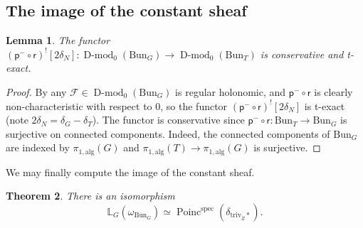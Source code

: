 \documentclass[11pt]{amsart}
\newcommand{\cF}{\mathcal{F}}
\newcommand{\triv}{\mathrm{triv}}
\newcommand{\spec}{\mathrm{spec}}
\newcommand{\Bun}{{\mathrm{Bun}}}
\newcommand{\Poinc}{\operatorname{Poinc}}
\newcommand{\pp}{{\mathsf{p}}}
\newcommand{\rr}{{\mathsf{r}}}
\DeclareMathOperator{\Dmod}{D-mod}
\newtheorem{thm}{Theorem}[section]
\newtheorem{lemma}[thm]{Lemma}
\theoremstyle{remark}
\theoremstyle{definition}
\begin{document}
\subsection{The image of the constant sheaf}
\begin{lemma}\label{lem:conservative-and-t-exact}
    The functor $(\pp^-\circ\rr)^![2\delta_N]\colon\Dmod_0(\Bun_G)\to\Dmod_0(\Bun_T)$ is conservative and t-exact.
\end{lemma}
\begin{proof}
    By \cite[Lemma~4.1.5.1 and Remark~4.1.5.2]{quasi-temp} any $\cF\in\Dmod_0(\Bun_G)$ is regular holonomic, and $\pp^-\circ\rr$ is clearly non-characteristic with respect to $0$, so the functor $(\pp^-\circ\rr)^![2\delta_N]$ is t-exact (note $2\delta_N=\delta_G-\delta_T$). The functor is conservative since $\pp^-\circ\rr\colon\Bun_T\to\Bun_G$ is surjective on connected components. Indeed, the connected components of $\Bun_G$ are indexed by $\pi_{1,\mathrm{alg}}(G)$ and $\pi_{1,\mathrm{alg}}(T)\to\pi_{1,\mathrm{alg}}(G)$ is surjective. 
\end{proof}
We may finally compute the image of the constant sheaf.
\begin{thm}\label{prop:image-of-constant-sheaf}
    There is an isomorphism
    \[
    \mathbb L_G(\omega_{\Bun_G})\simeq\Poinc^\spec(\delta_{\triv_{\check Z}*}).
    \]
\end{thm}
\end{document}
